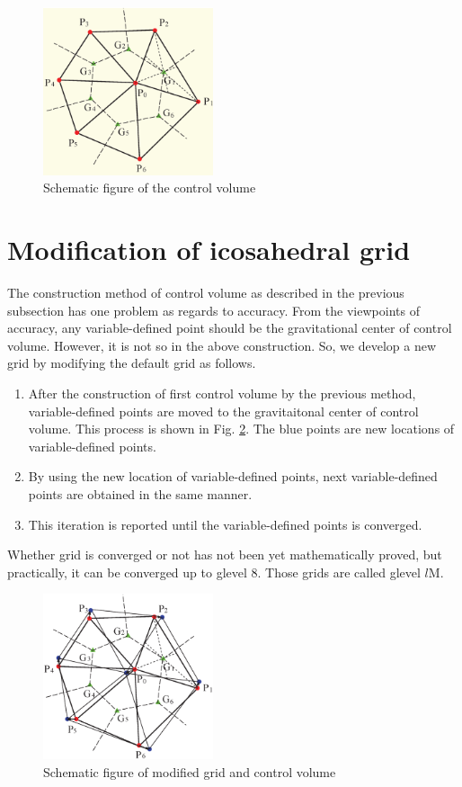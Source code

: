 \begin{figure}[H]
  \begin{center}
    \includegraphics[width=5cm]{figure/control_volume}
    \caption{Schematic figure of the control volume}
    \label{fig:scale-gm_control_volume}
  \end{center}
\end{figure}


\section{Modification of icosahedral grid}
The construction method of control volume as described in the previous
subsection has one problem as regards to accuracy. From the viewpoints of
accuracy, any variable-defined point should be the gravitational center of
control volume. However, it is not so in the above construction. So, we
develop a new grid by modifying the default grid as follows.
\begin{enumerate}
  \item After the construction of first control volume by the previous method,
    variable-defined points are moved to the gravitaitonal center of control
    volume. This process is shown in Fig. \ref{fig:scale-gm_modified_control_volume}. The blue points are new
    locations of variable-defined points.
  \item By using the new location of variable-defined points, next
    variable-defined points are obtained in the same manner.
  \item This iteration is reported until the variable-defined points is
    converged.
\end{enumerate}
Whether grid is converged or not has not been yet mathematically proved, but
practically, it can be converged up to glevel 8. Those grids are called glevel
$l$M.

\begin{figure}[H]
  \begin{center}
    \includegraphics[width=5cm]{figure/modified_control_volume}
    \caption{Schematic figure of modified grid and control volume}
    \label{fig:scale-gm_modified_control_volume}
  \end{center}
\end{figure}


